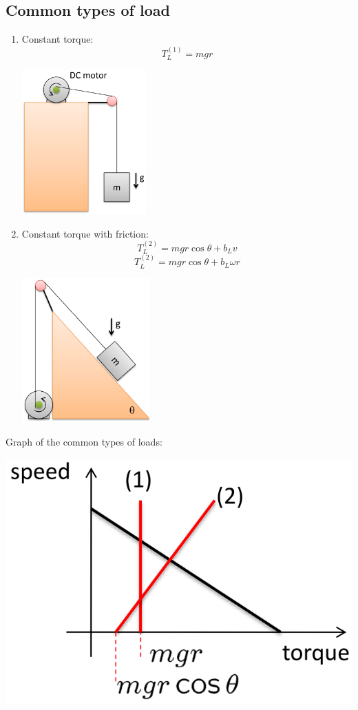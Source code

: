 \documentclass[11pt]{article}
\begin{document}
 \newpage
\subsection{Common types of load}
\label{sec:org5b91c73}
\begin{enumerate}
\item Constant torque:
\[T_L^{(1)} = mgr\]
\begin{center}
\includegraphics[height=15em]{./images/dc-motor-constant-torque-load-diagram.png}
\end{center}
\item Constant torque with friction:
\[T_L^{(2)} = mgr \cos \theta + b_L v\]
\[T_L^{(2)} = mgr \cos \theta + b_L \omega r\]
\begin{center}
\includegraphics[height=15em]{./images/dc-motor-constant-torque-with-friction-load-diagram.png}
\end{center}
\end{enumerate}

 \newpage

Graph of the common types of loads:
\begin{center}
\includegraphics[width=.9\linewidth]{./images/dc-motor-load-types-graph.png}
\end{center}
\end{document}
